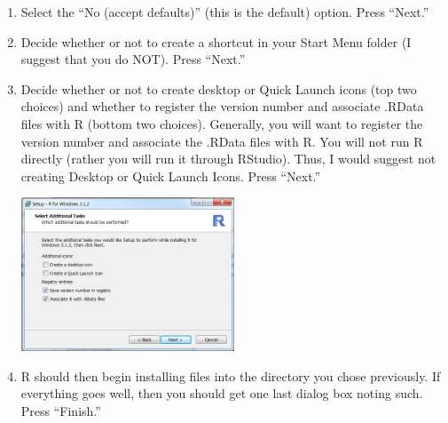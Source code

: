 \documentclass{article}\usepackage[]{graphicx}\usepackage[]{color}
\begin{document}
\begin{enumerate}
  \item Select the ``No (accept defaults)'' (this is the default) option.  Press ``Next.''

  \item Decide whether or not to create a shortcut in your Start Menu folder (I suggest that you do NOT).  Press ``Next.''

  \item Decide whether or not to create desktop or Quick Launch icons (top two choices) and whether to register the version number and associate .RData files with R (bottom two choices).  Generally, you will want to register the version number and associate the .RData files with R.  You will not run R directly (rather you will run it through RStudio).  Thus, I would suggest not creating Desktop or Quick Launch Icons.  Press ``Next.''
\begin{center}
  \includegraphics[width=2.5in]{Figs/R_Install_Options1.png}
\end{center}

  \item R should then begin installing files into the directory you chose previously.  If everything goes well, then you should get one last dialog box noting such.  Press ``Finish.''
\end{enumerate}
\end{document}
